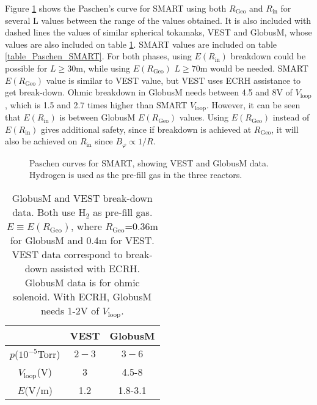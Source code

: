 \documentclass[a4paper,12pt,oneside]{book}
\begin{document}
Figure \ref{fig_Paschen} shows the Paschen's curve for SMART using both $R_\text{Geo}$ and $R_\text{in}$ for several L values between the range of the values obtained. It is also included with dashed lines the values of similar spherical tokamaks, VEST and GlobusM, whose values are also included on table  \ref{tabla_Paschen_GlobusVEST}. SMART values are included on table \ref{table_Paschen_SMART}. For both phases, using $E(R_\text{in})$ breakdown could be possible for $L \geq 30$m, while using $E(R_\text{Geo})$ $L \geq 70$m would be needed. SMART $E(R_\text{Geo})$ value is similar to VEST value, but VEST uses ECRH assistance to get break-down. Ohmic breakdown in GlobusM needs between 4.5 and 8V of $V_\text{loop}$, which is 1.5 and 2.7 times higher than SMART $V_\text{loop}$. However, it can be seen that $E(R_\text{in})$ is between GlobusM $E(R_\text{Geo})$ values. Using $E(R_\text{Geo})$ instead of $E(R_\text{in})$ gives additional safety, since if breakdown is achieved at $R_\text{Geo}$, it will also be achieved on $R_\text{in}$ since $B_\varphi \propto 1/R$.


\begin{figure}[htbp]
\centering
{}
\hfill
{}

\caption{Paschen curves for SMART, showing VEST and GlobusM data. Hydrogen is used as the pre-fill gas in the three reactors.}
\label{fig_Paschen}
\end{figure}


\begin{table}
	\centering		
	\begin{tabular}{|c|c|c|} \hline
		& VEST & GlobusM \\ \hline
		$p$($10^{-5}$Torr) & $2-3$ &  $3-6$ \\ \hline
		$V_\text{loop}$(V) & 3 & 4.5-8 \\ \hline
		$E$(V/m) & 1.2 & 1.8-3.1 \\ \hline
	\end{tabular}
	\caption{GlobusM \cite{Globus_2001} and VEST \cite{VEST_2015} break-down data. Both use H$_2$ as pre-fill gas. $E \equiv E(R_\text{Geo})$, where $R_\text{Geo}$=0.36m for GlobusM and  0.4m for VEST. VEST data correspond to break-down assisted with ECRH. GlobusM data is for ohmic solenoid. With ECRH, GlobusM needs 1-2V of $V_\text{loop}$.}
	\label{tabla_Paschen_GlobusVEST}
\end{table}
\end{document}
